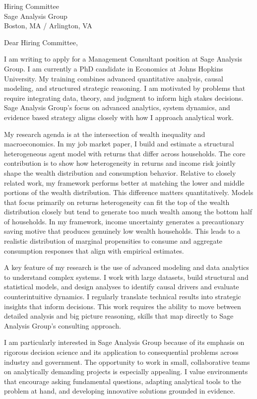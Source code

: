 \documentclass[11pt]{letter}
\begin{document}
\begin{letter}{Hiring Committee \\ Sage Analysis Group \\ Boston, MA / Arlington, VA}

\opening{Dear Hiring Committee,}

I am writing to apply for a Management Consultant position at Sage Analysis Group. I am currently a PhD candidate in Economics at Johns Hopkins University. My training combines advanced quantitative analysis, causal modeling, and structured strategic reasoning. I am motivated by problems that require integrating data, theory, and judgment to inform high stakes decisions. Sage Analysis Group’s focus on advanced analytics, system dynamics, and evidence based strategy aligns closely with how I approach analytical work.

My research agenda is at the intersection of wealth inequality and macroeconomics. In my job market paper, I build and estimate a structural heterogeneous agent model with returns that differ across households. The core contribution is to show how heterogeneity in returns and income risk jointly shape the wealth distribution and consumption behavior. Relative to closely related work, my framework performs better at matching the lower and middle portions of the wealth distribution. This difference matters quantitatively. Models that focus primarily on returns heterogeneity can fit the top of the wealth distribution closely but tend to generate too much wealth among the bottom half of households. In my framework, income uncertainty generates a precautionary saving motive that produces genuinely low wealth households. This leads to a realistic distribution of marginal propensities to consume and aggregate consumption responses that align with empirical estimates.

A key feature of my research is the use of advanced modeling and data analytics to understand complex systems. I work with large datasets, build structural and statistical models, and design analyses to identify causal drivers and evaluate counterintuitive dynamics. I regularly translate technical results into strategic insights that inform decisions. This work requires the ability to move between detailed analysis and big picture reasoning, skills that map directly to Sage Analysis Group’s consulting approach.

I am particularly interested in Sage Analysis Group because of its emphasis on rigorous decision science and its application to consequential problems across industry and government. The opportunity to work in small, collaborative teams on analytically demanding projects is especially appealing. I value environments that encourage asking fundamental questions, adapting analytical tools to the problem at hand, and developing innovative solutions grounded in evidence.


\end{letter}
\end{document}
